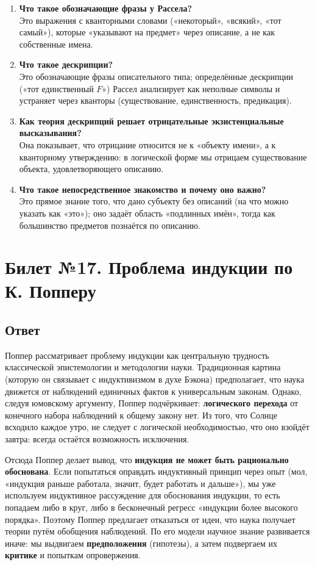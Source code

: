 \documentclass[a4paper,12pt]{article}
\begin{document}
\begin{enumerate}
    \item \textbf{Что такое обозначающие фразы у Рассела?}\\
    Это выражения с кванторными словами («некоторый», «всякий», «тот самый»), которые «указывают на предмет» через описание, а не как собственные имена.
    \item \textbf{Что такое дескрипции?}\\
    Это обозначающие фразы описательного типа; определённые дескрипции («тот единственный $F$») Рассел анализирует как неполные символы и устраняет через кванторы (существование, единственность, предикация).
    \item \textbf{Как теория дескрипций решает отрицательные экзистенциальные высказывания?}\\
    Она показывает, что отрицание относится не к «объекту имени», а к кванторному утверждению: в логической форме мы отрицаем существование объекта, удовлетворяющего описанию.
    \item \textbf{Что такое непосредственное знакомство и почему оно важно?}\\
    Это прямое знание того, что дано субъекту без описаний (на что можно указать как «это»); оно задаёт область «подлинных имён», тогда как большинство предметов познаётся по описанию.
\end{enumerate}


\newpage
\section{Билет №17. Проблема индукции по К. Попперу}

\subsection{Ответ}

Поппер рассматривает проблему индукции как центральную трудность классической эпистемологии и методологии науки. Традиционная картина (которую он связывает с индуктивизмом в духе Бэкона) предполагает, что наука движется от наблюдений единичных фактов к универсальным законам. Однако, следуя юмовскому аргументу, Поппер подчёркивает: \textbf{логического перехода} от конечного набора наблюдений к общему закону нет. Из того, что Солнце всходило каждое утро, не следует с логической необходимостью, что оно взойдёт завтра: всегда остаётся возможность исключения.

Отсюда Поппер делает вывод, что \textbf{индукция не может быть рационально обоснована}. Если попытаться оправдать индуктивный принцип через опыт (мол, «индукция раньше работала, значит, будет работать и дальше»), мы уже используем индуктивное рассуждение для обоснования индукции, то есть попадаем либо в круг, либо в бесконечный регресс «индукции более высокого порядка». Поэтому Поппер предлагает отказаться от идеи, что наука получает теории путём обобщения наблюдений. По его модели научное знание развивается иначе: мы выдвигаем \textbf{предположения} (гипотезы), а затем подвергаем их \textbf{критике} и попыткам опровержения.
\end{document}
